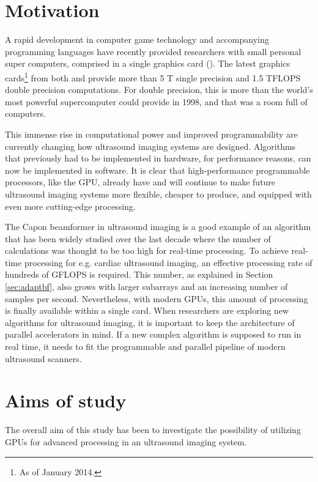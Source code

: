 \section{Motivation}
A rapid development in computer game technology and accompanying programming languages have recently provided researchers with small personal super computers, comprised in a single graphics card (). The latest graphics cards\footnote{As of January 2014.} from both  and  provide more than 5 T single precision and 1.5 TFLOPS double precision computations. For double precision, this is more than the world's most powerful supercomputer could provide in 1998, and that was a room full of computers.

This immense rise in computational power and improved programmability are currently changing how ultrasound imaging systems are designed. Algorithms that previously had to be implemented in hardware, for performance reasons, can now be implemented in software. 
It is clear that high-performance programmable processors, like the GPU, already have and will continue to make future ultrasound imaging systems more flexible, cheaper to produce, and equipped with even more cutting-edge processing.

The Capon beamformer in ultrasound imaging is a good example of an algorithm that has been widely studied over the last decade where the number of calculations was thought to be too high for real-time processing. To achieve real-time processing for e.g. cardiac ultrasound imaging, an effective processing rate of hundreds of GFLOPS is required. This number, as explained in Section \ref{sec:adaptbf}, also grows with larger subarrays and an increasing number of samples per second. Nevertheless, with modern GPUs, this amount of processing is finally available within a single card. When researchers are exploring new algorithms for ultrasound imaging, it is important to keep the architecture of parallel accelerators in mind. If a new complex algorithm is supposed to run in real time, it needs to fit the programmable and parallel pipeline of modern ultrasound scanners.

\section{Aims of study}
The overall aim of this study has been to investigate the possibility of utilizing GPUs for advanced processing in an ultrasound imaging system. 

